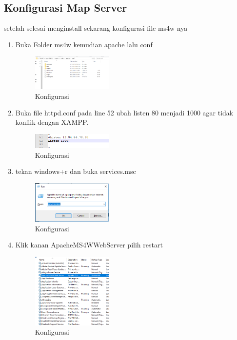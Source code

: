 \subsection{Konfigurasi Map Server}
setelah selesai menginstall sekarang konfigurasi file ms4w nya
\begin{enumerate}
  \item Buka Folder ms4w kemudian apache lalu conf
  \hfill\break
    \begin{figure}[H]
		\includegraphics[width=4cm]{figures/tugas4/1174091/3.png}
		\centering
		\caption{Konfigurasi}
    \end{figure}

  \item Buka file httpd.conf pada line 52 ubah listen 80 menjadi 1000 agar tidak konflik dengan XAMPP.
  \hfill\break
    \begin{figure}[H]
		\includegraphics[width=4cm]{figures/tugas4/1174091/4.png}
		\centering
		\caption{Konfigurasi}
    \end{figure}

  \item tekan windows+r dan buka services.msc
  \hfill\break
    \begin{figure}[H]
		\includegraphics[width=4cm]{figures/tugas4/1174091/5.png}
		\centering
		\caption{Konfigurasi}
    \end{figure}

  \item Klik kanan ApacheMS4WWebServer pilih restart 
  \hfill\break
  \begin{figure}[H]
  \includegraphics[width=4cm]{figures/tugas4/1174091/6.png}
  \centering
  \caption{Konfigurasi}
  \end{figure}

\end{enumerate}



